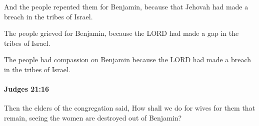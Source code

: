 			\begin{versebox}
					\item[BHS] 
					\item[ASV] And the people repented them for Benjamin, because that Jehovah had made a breach in the tribes of Israel.
					\item[NIV] The people grieved for Benjamin, because the LORD had made a gap in the tribes of Israel.
					\item[NRSV] The people had compassion on Benjamin because the LORD had made a breach in the tribes of Israel.
			\end{versebox}

		\paragraph{Judges 21:16} %
			\label{JUDGES-21-16}

			Then the elders of the congregation said, How shall we do for wives for them that remain, seeing the women are destroyed out of Benjamin?

